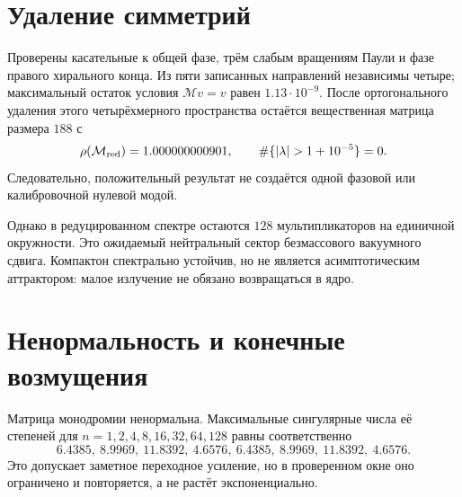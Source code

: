 \section{Удаление симметрий}

Проверены касательные к общей фазе, трём слабым вращениям Паули и фазе
правого хирального конца. Из пяти записанных направлений независимы четыре;
максимальный остаток условия $\mathcal Mv=v$ равен
$1.13\cdot10^{-9}$. После ортогонального удаления этого четырёхмерного
пространства остаётся вещественная матрица размера $188$ с
\begin{equation}
 \rho(\mathcal M_{\rm red})=1.000000000901,
 \qquad
 \#\{|\lambda|>1+10^{-5}\}=0.
 \label{eq:v6-compacton-reduced-radius}
\end{equation}
Следовательно, положительный результат не создаётся одной фазовой или
калибровочной нулевой модой.

Однако в редуцированном спектре остаются $128$ мультипликаторов на
единичной окружности. Это ожидаемый нейтральный сектор безмассового
вакуумного сдвига. Компактон спектрально устойчив, но не является
асимптотическим аттрактором: малое излучение не обязано возвращаться в
ядро.

\section{Ненормальность и конечные возмущения}

Матрица монодромии ненормальна. Максимальные сингулярные числа её степеней
для $n=1,2,4,8,16,32,64,128$ равны соответственно
\begin{equation}
 6.4385,\ 8.9969,\ 11.8392,\ 4.6576,\
 6.4385,\ 8.9969,\ 11.8392,\ 4.6576.
\end{equation}
Это допускает заметное переходное усиление, но в проверенном окне оно
ограничено и повторяется, а не растёт экспоненциально.

